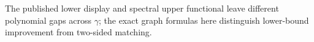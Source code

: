The published lower display and spectral upper functional leave different polynomial gaps across \(\gamma\); the exact graph formulas here distinguish lower-bound improvement from two-sided matching.